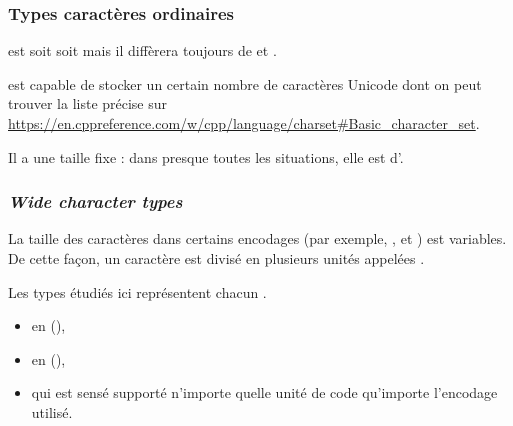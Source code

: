 \documentclass{cppcourses}
\begin{document}
\begin{frame}

\frametitle{Types caractères ordinaires}

 est soit  soit  mais il diffèrera toujours de
 et .

 est capable de stocker un certain nombre de caractères Unicode dont on peut trouver la liste précise sur \url{https://en.cppreference.com/w/cpp/language/charset\#Basic\_character\_set}.

Il a une taille fixe : dans presque toutes les situations, elle est d'.

\end{frame}

\begin{frame}

\frametitle{\emph{Wide character types}}

\begin{definition}
La taille des caractères dans certains encodages (par exemple, ,  et ) est variables. De cette façon, un caractère est divisé en plusieurs unités appelées .
\end{definition}

Les types étudiés ici représentent chacun .


\begin{itemize}
    \item<2->  en  (),
    \item<3->  en  (),
    \item<4->  qui est sensé supporté n'importe quelle unité de code qu'importe l'encodage utilisé.
\end{itemize}


\end{frame}
\end{document}
